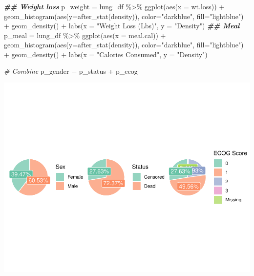 \documentclass[
]{article}
\newenvironment{Shaded}{\begin{snugshade}}{\end{snugshade}}
\newcommand{\AttributeTok}[1]{\textcolor[rgb]{0.77,0.63,0.00}{#1}}
\newcommand{\CommentTok}[1]{\textcolor[rgb]{0.56,0.35,0.01}{\textit{#1}}}
\newcommand{\DocumentationTok}[1]{\textcolor[rgb]{0.56,0.35,0.01}{\textbf{\textit{#1}}}}
\newcommand{\FunctionTok}[1]{\textcolor[rgb]{0.00,0.00,0.00}{#1}}
\newcommand{\NormalTok}[1]{#1}
\newcommand{\OtherTok}[1]{\textcolor[rgb]{0.56,0.35,0.01}{#1}}
\newcommand{\SpecialCharTok}[1]{\textcolor[rgb]{0.00,0.00,0.00}{#1}}
\newcommand{\StringTok}[1]{\textcolor[rgb]{0.31,0.60,0.02}{#1}}
\begin{document}
\begin{Shaded}
\begin{Highlighting}[]
\DocumentationTok{\#\# Weight loss}
\NormalTok{p\_weight }\OtherTok{=}
\NormalTok{  lung\_df }\SpecialCharTok{\%\textgreater{}\%} \FunctionTok{ggplot}\NormalTok{(}\FunctionTok{aes}\NormalTok{(}\AttributeTok{x =}\NormalTok{ wt.loss)) }\SpecialCharTok{+} 
  \FunctionTok{geom\_histogram}\NormalTok{(}\FunctionTok{aes}\NormalTok{(}\AttributeTok{y=}\FunctionTok{after\_stat}\NormalTok{(density)), }\AttributeTok{color=}\StringTok{"darkblue"}\NormalTok{, }\AttributeTok{fill=}\StringTok{"lightblue"}\NormalTok{) }\SpecialCharTok{+}
  \FunctionTok{geom\_density}\NormalTok{() }\SpecialCharTok{+}
    \FunctionTok{labs}\NormalTok{(}\AttributeTok{x =} \StringTok{"Weight Loss (Lbs)"}\NormalTok{,}
       \AttributeTok{y =} \StringTok{"Density"}\NormalTok{)}
\DocumentationTok{\#\# Meal}
\NormalTok{p\_meal }\OtherTok{=}
\NormalTok{  lung\_df }\SpecialCharTok{\%\textgreater{}\%}
  \FunctionTok{ggplot}\NormalTok{(}\FunctionTok{aes}\NormalTok{(}\AttributeTok{x =}\NormalTok{ meal.cal)) }\SpecialCharTok{+} 
  \FunctionTok{geom\_histogram}\NormalTok{(}\FunctionTok{aes}\NormalTok{(}\AttributeTok{y=}\FunctionTok{after\_stat}\NormalTok{(density)), }\AttributeTok{color=}\StringTok{"darkblue"}\NormalTok{, }\AttributeTok{fill=}\StringTok{"lightblue"}\NormalTok{) }\SpecialCharTok{+}
  \FunctionTok{geom\_density}\NormalTok{() }\SpecialCharTok{+}
  \FunctionTok{labs}\NormalTok{(}\AttributeTok{x =} \StringTok{"Calories Consumed"}\NormalTok{,}
       \AttributeTok{y =} \StringTok{"Density"}\NormalTok{)}
\end{Highlighting}
\end{Shaded}

\begin{Shaded}
\begin{Highlighting}[]
\CommentTok{\# Combine}
\NormalTok{p\_gender  }\SpecialCharTok{+}\NormalTok{ p\_status }\SpecialCharTok{+}\NormalTok{ p\_ecog}
\end{Highlighting}
\end{Shaded}

\includegraphics{final_project_files/figure-latex/unnamed-chunk-6-1.pdf}
\end{document}
